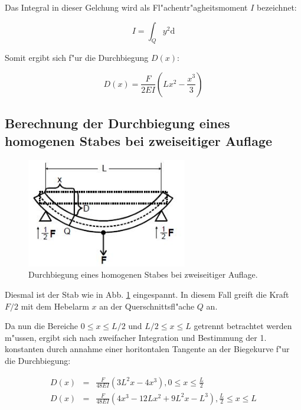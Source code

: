 Das Integral in dieser Gelchung wird als Fl"achentr"agheitsmoment $I$ bezeichnet:

\begin{equation}
I = \int_Q y^2 \mathrm{d}
\end{equation}

Somit ergibt sich f"ur die Durchbiegung $D(x)$:

\begin{equation}
D(x) = \frac{F}{2EI} \left( Lx^2- \frac{x^3}{3} \right)
\end{equation}

\subsection{Berechnung der Durchbiegung eines homogenen Stabes bei zweiseitiger Auflage} %
\label{sub:2}

\begin{figure}[!h]
\centering
\includegraphics[width = 7cm]{img/biegung2.JPG}
\caption{Durchbiegung eines homogenen Stabes bei zweiseitiger Auflage.}
\label{fg:biegung2}
\end{figure}

Diesmal ist der Stab wie in Abb. \ref{fg:biegung2} eingespannt. In diesem Fall greift die Kraft $F/2$ mit dem Hebelarm $x$ an der Querschnittsfl"ache $Q$ an.

Da nun die Bereiche $0 \leq x \leq L/2$ und $L/2 \leq x \leq L$ getrennt betrachtet werden m"ussen, ergibt sich nach zweifacher Integration und Bestimmung der 1. konstanten durch annahme einer horitontalen Tangente an der Biegekurve f"ur die Durchbiegung:

\begin{eqnarray}
D(x) &=& \frac{F}{48EI}(3L^2x-4x^3) , 0 \leq x \leq \frac{L}{2} \\
D(x) &=& \frac{F}{48EI}(4x^3-12Lx^2+9L^2x-L^3) , \frac{L}{2} \leq x \leq L
\end{eqnarray}